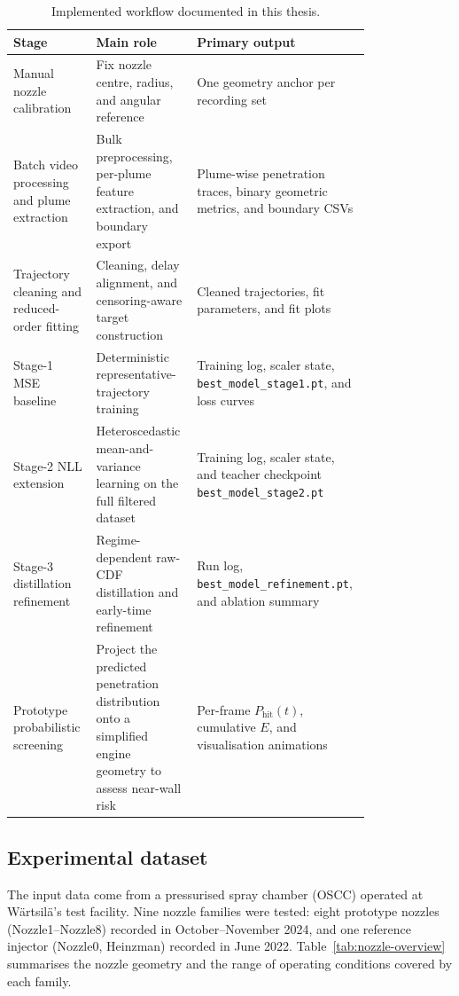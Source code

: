 \documentclass[english, 12pt, a4paper, elec, utf8, a-2b, online]{aaltothesis}
\DeclareRobustCommand{\codepath}[1]{\nolinkurl{#1}}
\begin{document}
\begin{table}[t]
\centering
\begin{tabular}{|L{0.21\linewidth}|L{0.26\linewidth}|L{0.33\linewidth}|}
\hline
Stage & Main role & Primary output \\
\hline
Manual nozzle calibration & Fix nozzle centre, radius, and angular reference & One geometry anchor per recording set \\
\hline
Batch video processing and plume extraction & Bulk preprocessing, per-plume feature extraction, and boundary export & Plume-wise penetration traces, binary geometric metrics, and boundary CSVs \\
\hline
Trajectory cleaning and reduced-order fitting & Cleaning, delay alignment, and censoring-aware target construction & Cleaned trajectories, fit parameters, and fit plots \\
\hline
Stage-1 MSE baseline & Deterministic representative-trajectory training & Training log, scaler state, \codepath{best\_model\_stage1.pt}, and loss curves \\
\hline
Stage-2 NLL extension & Heteroscedastic mean-and-variance learning on the full filtered dataset & Training log, scaler state, and teacher checkpoint \codepath{best\_model\_stage2.pt} \\
\hline
Stage-3 distillation refinement & Regime-dependent raw-CDF distillation and early-time refinement & Run log, \codepath{best\_model\_refinement.pt}, and ablation summary \\
\hline
Prototype probabilistic screening & Project the predicted penetration distribution onto a simplified engine geometry to assess near-wall risk & Per-frame $P_{\mathrm{hit}}(t)$, cumulative $E$, and visualisation animations \\
\hline
\end{tabular}
\caption{Implemented workflow documented in this thesis.}
\label{tab:workflow}
\end{table}

\subsection{Experimental dataset}

The input data come from a pressurised spray chamber (OSCC) operated at Wärtsilä's test facility.
Nine nozzle families were tested: eight prototype nozzles (Nozzle1--Nozzle8) recorded in October--November 2024,
and one reference injector (Nozzle0, Heinzman) recorded in June 2022.
Table~\ref{tab:nozzle-overview} summarises the nozzle geometry and the range of operating conditions covered by each family.
\end{document}
